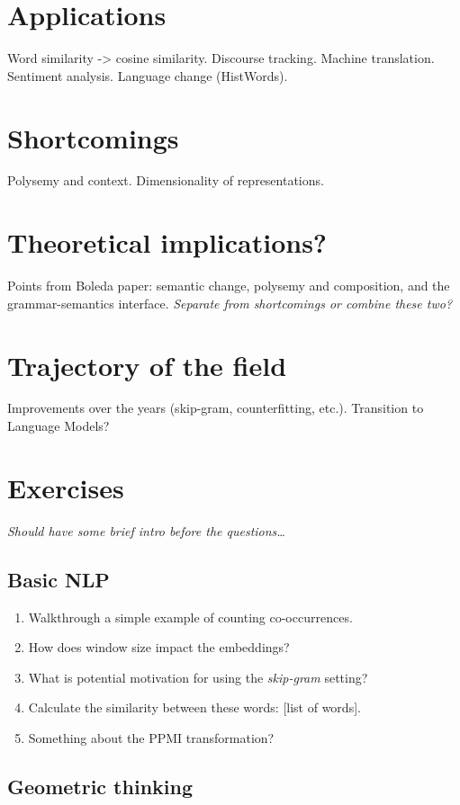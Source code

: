 \section{Applications}
Word similarity -> cosine similarity.
Discourse tracking.
Machine translation.
Sentiment analysis.
Language change (HistWords).

\section{Shortcomings}
Polysemy and context.
Dimensionality of representations.

\section{Theoretical implications?}
Points from Boleda paper: semantic change, polysemy and composition, and the grammar-semantics interface.
\textit{Separate from shortcomings or combine these two?}

\section{Trajectory of the field}
Improvements over the years (skip-gram, counterfitting, etc.).
Transition to Language Models?

\section{Exercises}

\textit{Should have some brief intro before the questions\dots}

\subsection{Basic NLP}

\begin{enumerate}
\item Walkthrough a simple example of counting co-occurrences.
\item How does window size impact the embeddings?
\item What is potential motivation for using the \textit{skip-gram} setting?
\item Calculate the similarity between these words: [list of words]. 
\item Something about the PPMI transformation?
\end{enumerate}

\subsection{Geometric thinking}

